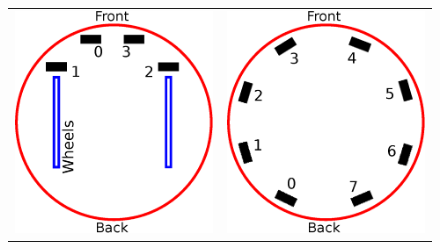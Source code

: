 \begin{figure}[htb]
\begin{center}
\begin{tabular}{cc}
\includegraphics[scale=0.35]{Bilder/ProxFloorIDs.eps} &
\includegraphics[scale=0.35]{Bilder/ProxRingIDs.eps} \\

\end{tabular}
\end{center}
\end{figure}

